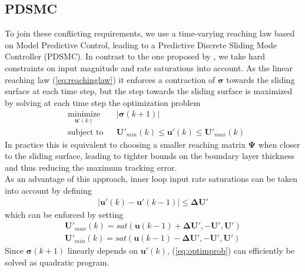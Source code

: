 \documentclass{ifacconf}
\providecommand{\mbf}[1]{\mathbf{#1}}
\newcommand{\idxSample}{{\ensuremath{k}}}
\begin{document}
\subsection{PDSMC}
To join these conflicting requirements, we use a time-varying reaching law based on Model Predictive Control, leading to a Predictive Discrete Sliding Mode Controller (PDSMC). 
In contrast to the one proposed by \cite{houda2013new}, we take hard constraints on input magnitude and rate saturations into account.
As the linear reaching law (\ref{eq:reachinglaw}) it enforces a contraction of $\mbf{\sigma}$ towards the sliding surface at each time step, but the step towards the sliding surface is maximized by solving at each time step the optimization problem
\begin{align}
& \underset{\mbf{u'}(\idxSample)}{\text{minimize}}
& & |\mbf{\sigma}(\idxSample+1)| 
\label{eq:optimprob} \\
& \text{subject to}
& & \mbf{U}'_{min}(\idxSample) \leq \mbf{u'}(\idxSample) \leq \mbf{U}'_{max}(\idxSample) 
\end{align}
In practice this is equivalent to choosing a smaller reaching matrix $\mbf{\Psi}$ when closer to the sliding surface, leading to tighter bounds on the boundary layer thickness and thus reducing the maximum tracking error.\\
As an advantage of this approach, inner loop input rate saturations can be taken into account by defining 
\begin{align}
|\mbf{u'}(\idxSample) - \mbf{u'}(\idxSample-1)| \leq \mbf{\Delta U}'
\end{align}
which can be enforced by setting
\begin{align}
\mbf{U}'_{max}(\idxSample) = sat(\mbf{u}(\idxSample-1) + \mbf{\Delta U}', -\mbf{U}', \mbf{U}') \\
\mbf{U}'_{min}(\idxSample) = sat(\mbf{u}(\idxSample-1) - \mbf{\Delta U}', -\mbf{U}', \mbf{U}') 
\end{align}
Since $\mbf{\sigma}(\idxSample + 1)$ linearly depends on $\mbf{u}'(\idxSample)$, (\ref{eq:optimprob}) can efficiently be solved as quadratic program.
\end{document}
